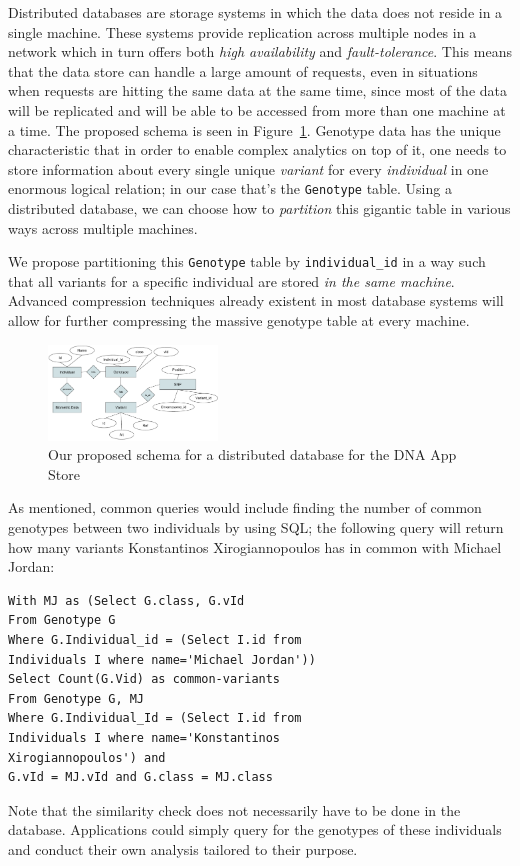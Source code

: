 \documentclass[conference,twocolumn,10pt]{IEEEtran}
\begin{document}
Distributed databases are storage systems in which the data does not reside in a single machine. These systems provide replication across multiple nodes in a network which in turn offers both \textit{high availability} and \textit{fault-tolerance}. This means that the data store can handle a large amount of requests, even in situations when requests are hitting the same data at the same time, since most of the data will be replicated and will be able to be accessed from more than one machine at a time. The proposed schema is seen in Figure~\ref{fig:schema}. Genotype data has the unique characteristic that in order to enable complex analytics on top of it, one needs to store information about every single unique \textit{variant} for every \textit{individual} in one enormous logical relation; in our case that's the \texttt{Genotype} table. Using a distributed database, we can choose how to \textit{partition} this gigantic table in various ways across multiple machines.

We propose partitioning this \texttt{Genotype} table by \texttt{individual\_id} in a way such that all variants for a specific individual are stored \textit{in the same machine}. Advanced compression techniques already existent in most database systems will allow for further compressing the massive genotype table at every machine.

\begin{figure}[t]
    \centering
    \includegraphics[width=0.40\textwidth]{schema}
    \caption{Our proposed schema for a distributed database for the DNA App Store}
    \label{fig:schema}
\end{figure}

As mentioned, common queries would include finding the number of common genotypes between two individuals by using SQL; the following query will return how many variants Konstantinos Xirogiannopoulos has in common with Michael Jordan:
\begin{lstlisting}
With MJ as (Select G.class, G.vId
From Genotype G
Where G.Individual_id = (Select I.id from
Individuals I where name='Michael Jordan'))
Select Count(G.Vid) as common-variants
From Genotype G, MJ
Where G.Individual_Id = (Select I.id from
Individuals I where name='Konstantinos
Xirogiannopoulos') and
G.vId = MJ.vId and G.class = MJ.class
\end{lstlisting}
Note that the similarity check does not necessarily have to be done in the database. Applications could simply query for the genotypes of these individuals and conduct their own analysis tailored to their purpose.
\end{document}
